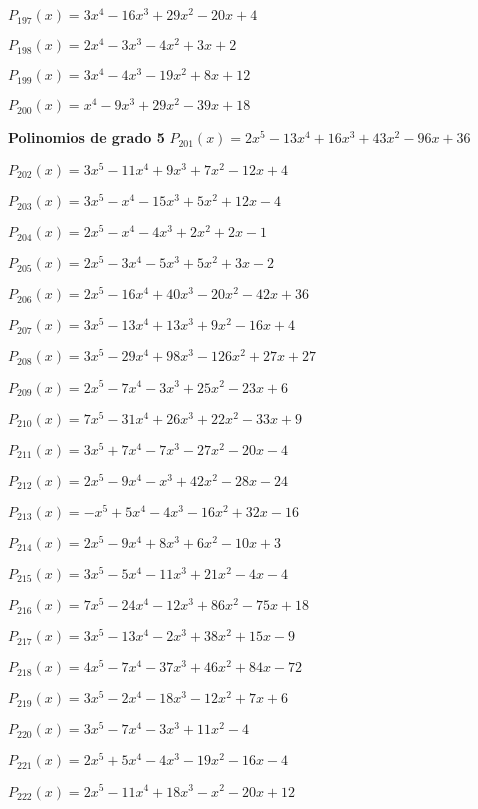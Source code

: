 \subitem $P_{197}(x) = 3x^4 - 16x^3 + 29x^2 - 20x + 4$

\subitem $P_{198}(x) = 2x^4 - 3x^3 - 4x^2 + 3x + 2$

\subitem $P_{199}(x) = 3x^4 - 4x^3 - 19x^2 + 8x + 12$

\subitem $P_{200}(x) = x^4 - 9x^3 + 29x^2 - 39x + 18$

\textbf{Polinomios de grado 5} 
\subitem $P_{201}(x) = 2x^5 - 13x^4 + 16x^3 + 43x^2 - 96x + 36$

\subitem $P_{202}(x) = 3x^5 - 11x^4 + 9x^3 + 7x^2 - 12x + 4$

\subitem $P_{203}(x) = 3x^5 - x^4 - 15x^3 + 5x^2 + 12x - 4$

\subitem $P_{204}(x) = 2x^5 - x^4 - 4x^3 + 2x^2 + 2x - 1$

\subitem $P_{205}(x) = 2x^5 - 3x^4 - 5x^3 + 5x^2 + 3x - 2$

\subitem $P_{206}(x) = 2x^5 - 16x^4 + 40x^3 - 20x^2 - 42x + 36$

\subitem $P_{207}(x) = 3x^5 - 13x^4 + 13x^3 + 9x^2 - 16x + 4$

\subitem $P_{208}(x) = 3x^5 - 29x^4 + 98x^3 - 126x^2 + 27x + 27$

\subitem $P_{209}(x) = 2x^5 - 7x^4 - 3x^3 + 25x^2 - 23x + 6$

\subitem $P_{210}(x) = 7x^5 - 31x^4 + 26x^3 + 22x^2 - 33x + 9$

\subitem $P_{211}(x) = 3x^5 + 7x^4 - 7x^3 - 27x^2 - 20x - 4$

\subitem $P_{212}(x) = 2x^5 - 9x^4 - x^3 + 42x^2 - 28x - 24$

\subitem $P_{213}(x) = -x^5 + 5x^4 - 4x^3 - 16x^2 + 32x - 16$

\subitem $P_{214}(x) = 2x^5 - 9x^4 + 8x^3 + 6x^2 - 10x + 3$

\subitem $P_{215}(x) = 3x^5 - 5x^4 - 11x^3 + 21x^2 - 4x - 4$

\subitem $P_{216}(x) = 7x^5 - 24x^4 - 12x^3 + 86x^2 - 75x + 18$

\subitem $P_{217}(x) = 3x^5 - 13x^4 - 2x^3 + 38x^2 + 15x - 9$

\subitem $P_{218}(x) = 4x^5 - 7x^4 - 37x^3 + 46x^2 + 84x - 72$

\subitem $P_{219}(x) = 3x^5 - 2x^4 - 18x^3 - 12x^2 + 7x + 6$

\subitem $P_{220}(x) = 3x^5 - 7x^4 - 3x^3 + 11x^2 - 4$

\subitem $P_{221}(x) = 2x^5 + 5x^4 - 4x^3 - 19x^2 - 16x - 4$

\subitem $P_{222}(x) = 2x^5 - 11x^4 + 18x^3 - x^2 - 20x + 12$

